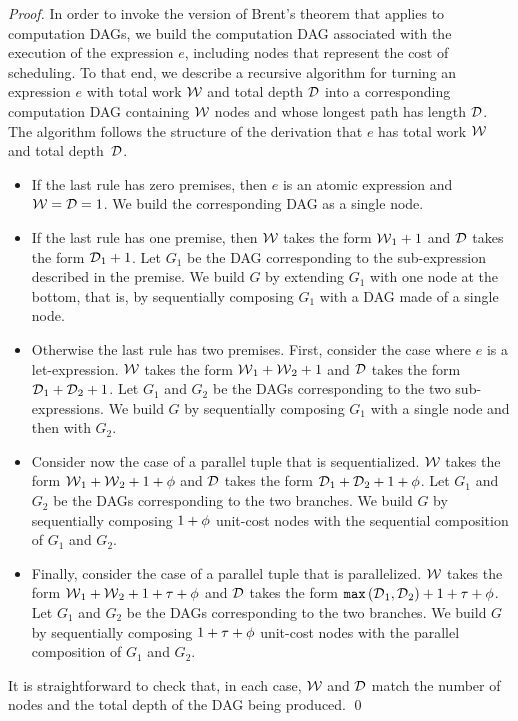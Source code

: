 \begin{proof}
In order to invoke the version of Brent's theorem that applies 
to computation DAGs, we build the computation DAG associated 
with the execution of the expression $e$, including nodes that
represent the cost of scheduling.
To that end, we describe a recursive algorithm for turning 
an expression $e$ with total work ${\mathcal{W}}$ and total depth ${\mathcal{D}}$
into a corresponding computation DAG containing ${\mathcal{W}}$ nodes and
whose longest path has length ${\mathcal{D}}$.
The algorithm follows the structure of the derivation that
$e$ has total work ${\mathcal{W}}$ and total depth~${\mathcal{D}}$.
\begin{itemize}
\item If the last rule has zero premises, then $e$ is an atomic expression
and ${\mathcal{W}} = {\mathcal{D}} = 1$. We build the corresponding DAG as a single node.
\item If the last rule has one premise, then ${\mathcal{W}}$ takes the form ${\mathcal{W}}{}_1 + 1$
and ${\mathcal{D}}$ takes the form ${\mathcal{D}}{}_1 + 1$. Let $G_1$ be the DAG corresponding
to the sub-expression described in the premise. We build $G$ by 
extending $G_1$ with one node at the bottom, that is, by
sequentially composing $G_1$ with a DAG made of a single node. 
\item Otherwise the last rule has two premises.
First, consider the case where $e$ is a let-expression. 
${\mathcal{W}}$ takes the form ${\mathcal{W}}{}_1 + {\mathcal{W}}{}_2 + 1$
and ${\mathcal{D}}$ takes the form ${\mathcal{D}}{}_1 + {\mathcal{D}}{}_2 + 1$.
Let $G_1$ and $G_2$ be the DAGs corresponding to the two sub-expressions.
We build $G$ by sequentially composing $G_1$ with a single node and then 
with $G_2$.
\item Consider now the case of a parallel tuple that is sequentialized.
${\mathcal{W}}$ takes the form ${\mathcal{W}}{}_1 + {\mathcal{W}}{}_2 + 1 + {\phi}$
and ${\mathcal{D}}$ takes the form ${\mathcal{D}}{}_1 + {\mathcal{D}}{}_2 + 1 + {\phi}$.
Let $G_1$ and $G_2$ be the DAGs corresponding to the two branches.
We build $G$ by sequentially composing $1 + {\phi}$ unit-cost nodes
with the sequential composition of $G_1$ and $G_2$.
\item Finally, consider the case of a parallel tuple that is parallelized.
${\mathcal{W}}$ takes the form ${\mathcal{W}}{}_1 + {\mathcal{W}}{}_2 + 1 + {\tau} + {\phi}$
and ${\mathcal{D}}$ takes the form ${\mathtt{{max}}}\left({\mathcal{D}}{}_1,{\mathcal{D}}{}_2\right) + 1 + {\tau} + {\phi}$.
Let $G_1$ and $G_2$ be the DAGs corresponding to the two branches.
We build $G$ by sequentially composing $1 + {\tau} + {\phi}$ unit-cost nodes
with the parallel composition of $G_1$ and $G_2$. 
\end{itemize}
It is straightforward to check that, in each case, ${\mathcal{W}}$ and ${\mathcal{D}}$ 
match the number of nodes and the total depth of the DAG being produced. \qed
\end{proof}


